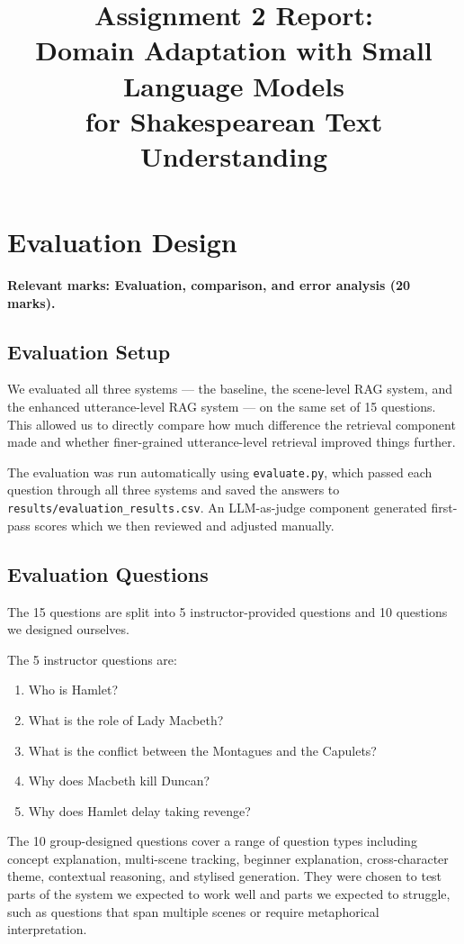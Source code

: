 \documentclass[10pt,conference]{IEEEtran}
\title{
Assignment 2 Report:\\
Domain Adaptation with Small Language Models\\
for Shakespearean Text Understanding
}
\author{
\IEEEauthorblockN{
Group Number: \emph{[Insert Group Number]}
}
\IEEEauthorblockA{
CSCI433/933 Machine Learning Algorithms and Applications\\
Student Names and Student Numbers: \emph{[Insert Details]}
}
}
\begin{document}
\maketitle

\section{Evaluation Design}
\label{sec:evaluation}

\textbf{Relevant marks: Evaluation, comparison, and error analysis
(20 marks).}

\subsection{Evaluation Setup}

We evaluated all three systems --- the baseline, the scene-level RAG
system, and the enhanced utterance-level RAG system --- on the same
set of 15 questions. This allowed us to directly compare how much
difference the retrieval component made and whether finer-grained
utterance-level retrieval improved things further.

The evaluation was run automatically using \texttt{evaluate.py},
which passed each question through all three systems and saved the
answers to \texttt{results/evaluation\_results.csv}. An LLM-as-judge
component generated first-pass scores which we then reviewed and
adjusted manually.

\subsection{Evaluation Questions}

The 15 questions are split into 5 instructor-provided questions and
10 questions we designed ourselves.

The 5 instructor questions are:
\begin{enumerate}
    \item Who is Hamlet?
    \item What is the role of Lady Macbeth?
    \item What is the conflict between the Montagues and the Capulets?
    \item Why does Macbeth kill Duncan?
    \item Why does Hamlet delay taking revenge?
\end{enumerate}

The 10 group-designed questions cover a range of question types
including concept explanation, multi-scene tracking, beginner
explanation, cross-character theme, contextual reasoning, and
stylised generation. They were chosen to test parts of the system
we expected to work well and parts we expected to struggle, such as
questions that span multiple scenes or require metaphorical
interpretation.
\end{document}
